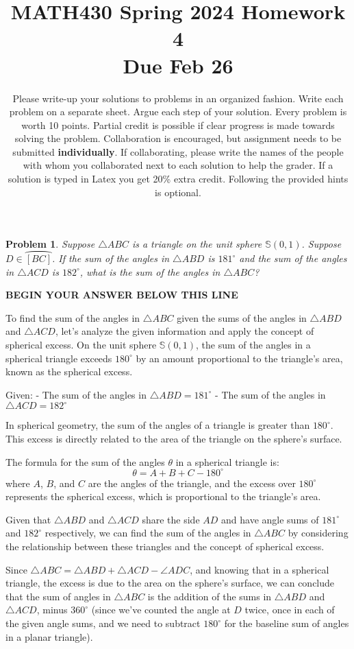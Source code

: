 \documentclass[letter,12pt]{article}
\title{MATH430 Spring 2024 Homework 4\\ \normalsize{Due Feb 26}}
\date{\small{Please write-up your solutions to problems in an organized fashion. Write each problem on a
separate sheet. Argue each step of your solution. Every problem is worth 10 points. Partial
credit is possible if clear progress is made towards solving the problem. Collaboration is
encouraged, but assignment needs to be submitted \textbf{individually}. If collaborating, please write
the names of the people with whom you collaborated next to each solution to help the grader.
If a solution is typed in Latex you get 20\% extra credit. Following the provided hints is
optional.
}}
\newtheorem{problem}[main_theorem]{Problem}
\newcommand{\answerspacetop}{
	\begin{center}
		\textbf{BEGIN YOUR ANSWER BELOW THIS LINE} \\ \hrulefill
	\end{center}
}
\begin{document}
\maketitle

\begin{problem}Suppose $\triangle ABC$ is a triangle on the unit sphere $\mathbb{S}(0, 1)$. Suppose $D \in  \wideparen {[BC]}$. If the sum of the angles in $\triangle ABD$ is $181^\circ$ and the sum of the angles in $\triangle ACD$ is $182^\circ$, what is the sum of the angles in $\triangle ABC$?
\end{problem}

\answerspacetop
To find the sum of the angles in $\triangle ABC$ given the sums of the angles in $\triangle ABD$ and $\triangle ACD$, let's analyze the given information and apply the concept of spherical excess. On the unit sphere $\mathbb{S}(0, 1)$, the sum of the angles in a spherical triangle exceeds $180^\circ$ by an amount proportional to the triangle's area, known as the spherical excess.

Given:
- The sum of the angles in $\triangle ABD = 181^\circ$
- The sum of the angles in $\triangle ACD = 182^\circ$

In spherical geometry, the sum of the angles of a triangle is greater than $180^\circ$. This excess is directly related to the area of the triangle on the sphere's surface.

The formula for the sum of the angles $\theta$ in a spherical triangle is:
$$
\theta = A + B + C - 180^\circ
$$
where $A$, $B$, and $C$ are the angles of the triangle, and the excess over $180^\circ$ represents the spherical excess, which is proportional to the triangle's area.

Given that $\triangle ABD$ and $\triangle ACD$ share the side $AD$ and have angle sums of $181^\circ$ and $182^\circ$ respectively, we can find the sum of the angles in $\triangle ABC$ by considering the relationship between these triangles and the concept of spherical excess.

Since $\triangle ABC = \triangle ABD + \triangle ACD - \angle ADC$, and knowing that in a spherical triangle, the excess is due to the area on the sphere's surface, we can conclude that the sum of angles in $\triangle ABC$ is the addition of the sums in $\triangle ABD$ and $\triangle ACD$, minus $360^\circ$ (since we've counted the angle at $D$ twice, once in each of the given angle sums, and we need to subtract $180^\circ$ for the baseline sum of angles in a planar triangle).
\end{document}
